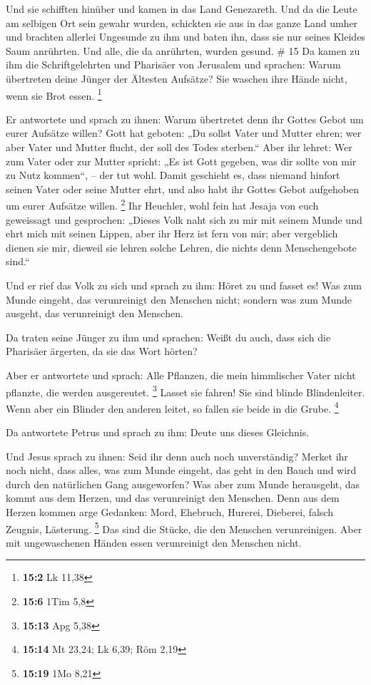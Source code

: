  Und sie schifften hinüber und kamen in das Land
Genezareth.  Und da die Leute am selbigen Ort sein gewahr
wurden, schickten sie aus in das ganze Land umher und brachten allerlei
Ungesunde zu ihm  und baten ihn, dass sie nur seines
Kleides Saum anrührten. Und alle, die da anrührten, wurden gesund. \# 15
 Da kamen zu ihm die Schriftgelehrten und Pharisäer von
Jerusalem und sprachen:  Warum übertreten deine Jünger der
Ältesten Aufsätze? Sie waschen ihre Hände nicht, wenn sie Brot essen.
\footnote{\textbf{15:2} Lk 11,38}

 Er antwortete und sprach zu ihnen: Warum übertretet denn
ihr Gottes Gebot um eurer Aufsätze willen?  Gott hat
geboten: „Du sollst Vater und Mutter ehren; wer aber Vater und Mutter
flucht, der soll des Todes sterben.``  Aber ihr lehret:
Wer zum Vater oder zur Mutter spricht: „Es ist Gott gegeben, was dir
sollte von mir zu Nutz kommen``, -- der tut wohl.  Damit
geschieht es, dass niemand hinfort seinen Vater oder seine Mutter ehrt,
und also habt ihr Gottes Gebot aufgehoben um eurer Aufsätze willen.
\footnote{\textbf{15:6} 1Tim 5,8}  Ihr Heuchler, wohl fein
hat Jesaja von euch geweissagt und gesprochen:  „Dieses
Volk naht sich zu mir mit seinem Munde und ehrt mich mit seinen Lippen,
aber ihr Herz ist fern von mir;  aber vergeblich dienen
sie mir, dieweil sie lehren solche Lehren, die nichts denn
Menschengebote sind.``

 Und er rief das Volk zu sich und sprach zu ihm: Höret zu
und fasset es!  Was zum Munde eingeht, das verunreinigt
den Menschen nicht; sondern was zum Munde ausgeht, das verunreinigt den
Menschen.

 Da traten seine Jünger zu ihm und sprachen: Weißt du
auch, dass sich die Pharisäer ärgerten, da sie das Wort hörten?

 Aber er antwortete und sprach: Alle Pflanzen, die mein
himmlischer Vater nicht pflanzte, die werden ausgereutet. \footnote{\textbf{15:13}
  Apg 5,38}  Lasset sie fahren! Sie sind blinde
Blindenleiter. Wenn aber ein Blinder den anderen leitet, so fallen sie
beide in die Grube. \footnote{\textbf{15:14} Mt 23,24; Lk 6,39; Röm 2,19}

 Da antwortete Petrus und sprach zu ihm: Deute uns dieses
Gleichnis.

 Und Jesus sprach zu ihnen: Seid ihr denn auch noch
unverständig?  Merket ihr noch nicht, dass alles, was zum
Munde eingeht, das geht in den Bauch und wird durch den natürlichen Gang
ausgeworfen?  Was aber zum Munde herausgeht, das kommt
aus dem Herzen, und das verunreinigt den Menschen.  Denn
aus dem Herzen kommen arge Gedanken: Mord, Ehebruch, Hurerei, Dieberei,
falsch Zeugnis, Lästerung. \footnote{\textbf{15:19} 1Mo 8,21}
 Das sind die Stücke, die den Menschen verunreinigen.
Aber mit ungewaschenen Händen essen verunreinigt den Menschen nicht.

